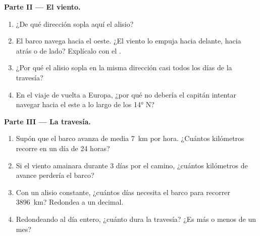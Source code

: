 \begin{problem}
\noindent\textbf{Parte II --- El viento.}\par\nopagebreak
\begin{enumerate}[resume, beginpenalty=10000]
  \item ¿De qué dirección sopla aquí el alisio?
  \item El barco navega hacia el oeste. ¿El viento lo empuja hacia
        delante, hacia atrás o de lado? Explícalo con el .
  \item ¿Por qué el alisio sopla en la misma dirección casi todos los días
        de la travesía?
  \item En el viaje de vuelta a Europa, ¿por qué no debería el capitán
        intentar navegar hacia el este a lo largo de los \ang{14} N?
\end{enumerate}

\noindent\textbf{Parte III --- La travesía.}\par\nopagebreak
\begin{enumerate}[resume, beginpenalty=10000]
  \item Supón que el barco avanza de media \qty{7}{km} por hora. ¿Cuántos
        kilómetros recorre en un día de 24 horas?
  \item Si el viento amainara durante 3 días por el camino, ¿cuántos
        kilómetros de avance perdería el barco?
  \item Con un alisio constante, ¿cuántos días necesita el barco para
        recorrer \qty{3896}{km}? Redondea a un decimal.
  \item Redondeando al día entero, ¿cuánto dura la travesía? ¿Es más o
        menos de un mes?
\end{enumerate}
\end{problem}
